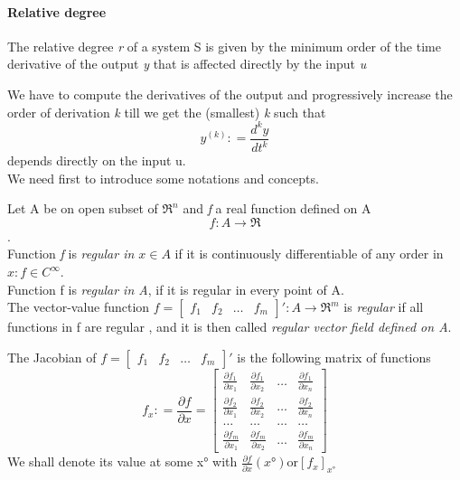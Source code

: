\paragraph{Relative degree}
\begin{defn}
	The relative degree \emph{r} of a system S is given by the minimum order of the time derivative of the output \emph{y} that is affected directly by the input \emph{u}
\end{defn}
We have to compute the derivatives of the output and progressively increase the order of derivation \emph{k} till we get the (smallest) \emph{k} such that \[y^{(k)}\colon=\frac{d^ky}{dt^k}\] depends directly on the input u.\\We need first to introduce some notations and concepts.
\begin{defn}
	Let A be on open subset of $\Re^n$ and \emph{f} a real function defined on A\[f\colon A\to\Re\].\\ Function \emph{f} is \emph{regular in $x \in A$} if it is continuously differentiable of any order in $x\colon f \in C^\infty$.\\Function f is \emph{regular in A}, if it is regular in every point of A.\\The vector-value function $f=\begin{bmatrix}
			f_1 & f_2 & \dots & f_m
		\end{bmatrix}'\colon A \to \Re^m$ is \emph{regular} if all functions in f are regular , and it is then called \emph{regular vector field defined on A}.
\end{defn}
\begin{defn}[Jacobian]
	The Jacobian of $f=\begin{bmatrix}
		f_1 & f_2 & \dots & f_m
	\end{bmatrix}'$ is the following matrix of functions 
\[
f_x\colon=\frac{\partial f}{\partial x}=
\begin{bmatrix}
	\frac{\partial f_1}{\partial x_1} & \frac{\partial f_1}{\partial x_2} & \dots & \frac{\partial f_1}{\partial x_n}\\
	\frac{\partial f_2}{\partial x_1} & \frac{\partial f_2}{\partial x_2} & \dots & \frac{\partial f_2}{\partial x_n}\\
	\dots & \dots & \dots & \dots \\
	\frac{\partial f_m}{\partial x_1} & \frac{\partial f_m}{\partial x_2} & \dots & \frac{\partial f_m}{\partial x_n}
\end{bmatrix}
\] We shall denote its value at some x° with $\frac{\partial f}{\partial x}(x°) \text{or} [f_x]_{x°}$
\end{defn}
